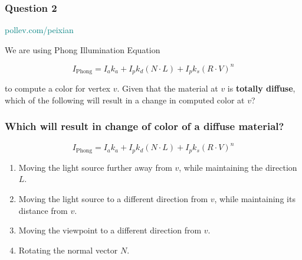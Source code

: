 \documentclass{beamer}
\begin{document}
\begin{frame}
    \frametitle{Question 2}

    \begin{tcolorbox}[colback=teal!5!white]
        \textcolor{teal}{pollev.com/peixian}
    \end{tcolorbox}

    We are using Phong Illumination Equation 

    \begin{equation*}
        I_\text{Phong} = I_a k_a + I_p k_d  (N \cdot L) + I_p k_s (R \cdot V)^n
    \end{equation*}

    to compute a color for vertex $v$. Given that the material at $v$ is 
    \textbf{totally diffuse}, which of the following will result in a change in computed color at $v$?

\end{frame}


\begin{frame}
    \frametitle{Which will result in change of color of a diffuse material?}

    \begin{equation*}
        I_\text{Phong} = I_a k_a + I_p k_d  (N \cdot L) + I_p k_s (R \cdot V)^n
    \end{equation*}

    \begin{enumerate}
        \item Moving the light source further away from $v$, while maintaining the direction $L$.
        \item Moving the light source to a different direction from $v$, while maintaining its distance from $v$.
        \item Moving the viewpoint to a different direction from $v$.
        \item Rotating the normal vector $N$.
    \end{enumerate}

\end{frame}
\end{document}
